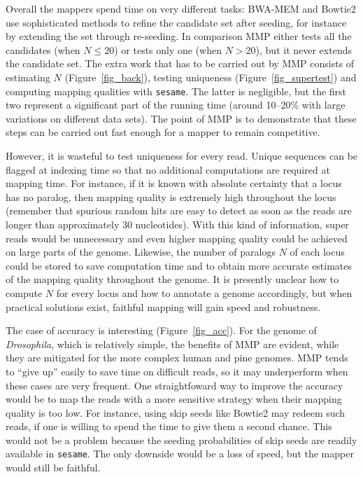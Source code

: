 \documentclass[a4,center,fleqn]{NAR}
\begin{document}
Overall the mappers spend time on very different tasks: BWA-MEM and
Bowtie2 use sophisticated methods to refine the candidate set after
seeding, for instance by extending the set through re-seeding. In
comparison MMP either tests all the candidates (when $N \leq 20$) or tests
only one (when $N > 20$), but it never extends the candidate set. The
extra work that has to be carried out by MMP consists of estimating $N$
(Figure~\ref{fig_back}), testing uniqueness (Figure~\ref{fig_supertest})
and computing mapping qualities with \texttt{sesame}. The latter is
negligible, but the first two represent a significant part of the running
time (around 10--20\% with large variations on different data sets). The
point of MMP is to demonstrate that these steps can be carried out fast
enough for a mapper to remain competitive.

However, it is wasteful to test uniqueness for every read. Unique
sequences can be flagged at indexing time so that no additional
computations are required at mapping time. For instance, if it is known
with absolute certainty that a locus has no paralog, then mapping quality
is extremely high throughout the locus (remember that spurious random hits
are easy to detect as soon as the reads are longer than approximately 30
nucleotides). With this kind of information, super reads would be
unnecessary and even higher mapping quality could be achieved on large
parts of the genome. Likewise, the number of paralogs $N$ of each locus
could be stored to save computation time and to obtain more accurate
estimates of the mapping quality throughout the genome. It is presently
unclear how to compute $N$ for every locus and how to annotate a genome
accordingly, but when practical solutions exist, faithful mapping will
gain speed and robustness.

The case of accuracy is interesting (Figure~\ref{fig_acc}). For  the
genome of \textit{Drosophila}, which is relatively simple, the benefits of
MMP  are evident, while they are mitigated for the more complex human and
pine genomes. MMP tends to ``give up'' easily to save time on difficult
reads, so it may underperform when these cases are very frequent. One
straightfoward way to improve the accuracy would be to map the reads with
a more sensitive strategy when their mapping quality is too low. For
instance, using skip seeds like Bowtie2 may redeem such reads, if one is
willing to spend the time to give them a second chance. This would not be
a problem because the seeding probabilities of skip seeds are readily
available in \texttt{sesame}. The only downside would be a loss of speed,
but the mapper would still be faithful.
\end{document}
